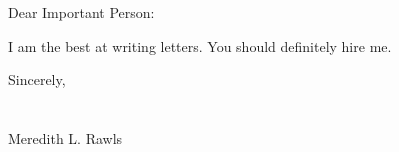 \documentclass{letter}
\begin{document}
    \begin{letter}{}
        \opening{Dear Important Person:}
I am the best at writing letters. You should definitely hire me.

\lipsum[1-5]

Sincerely,\\ \\ \\

Meredith L. Rawls

    \end{letter}
\end{document}
